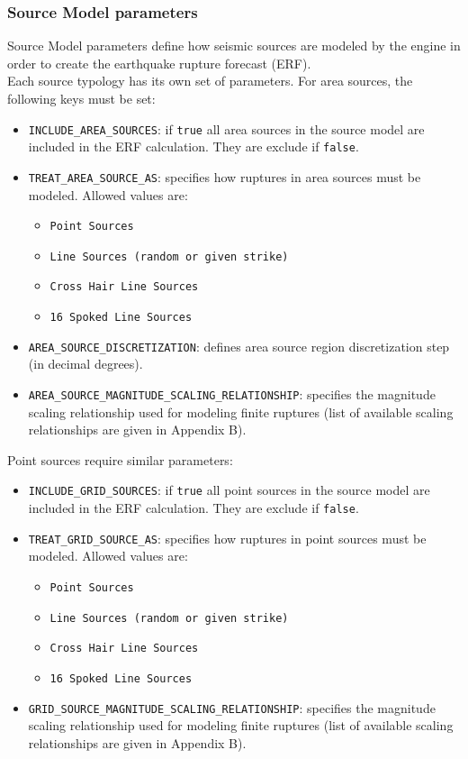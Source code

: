 \subsubsection{Source Model parameters}
Source Model parameters define how seismic sources are modeled by the engine in order to create the earthquake rupture forecast (ERF).\\
Each source typology has its own set of parameters. For area sources, the following keys must be set:
\begin{itemize}
\item \Verb+INCLUDE_AREA_SOURCES+: if \Verb+true+ all area sources in the source model are included in the ERF calculation. They are exclude if \Verb+false+.
\item \Verb+TREAT_AREA_SOURCE_AS+: specifies how ruptures in area sources must be modeled. Allowed values are:
\begin{itemize}
\item \Verb+Point Sources+
\item \Verb+Line Sources (random or given strike)+
\item \Verb+Cross Hair Line Sources+
\item \Verb+16 Spoked Line Sources+
\end{itemize}
\item \Verb+AREA_SOURCE_DISCRETIZATION+: defines area source region discretization step (in decimal degrees).
\item \Verb+AREA_SOURCE_MAGNITUDE_SCALING_RELATIONSHIP+: specifies the magnitude scaling relationship used for modeling finite ruptures (list of available scaling relationships are given in Appendix B).
\end{itemize}

Point sources require similar parameters:
\begin{itemize}
\item \Verb+INCLUDE_GRID_SOURCES+: if \Verb+true+ all point sources in the source model are included in the ERF calculation. They are exclude if \Verb+false+.
\item \Verb+TREAT_GRID_SOURCE_AS+: specifies how ruptures in point sources must be modeled. Allowed values are:
\begin{itemize}
\item \Verb+Point Sources+
\item \Verb+Line Sources (random or given strike)+
\item \Verb+Cross Hair Line Sources+
\item \Verb+16 Spoked Line Sources+
\end{itemize}
\item \Verb+GRID_SOURCE_MAGNITUDE_SCALING_RELATIONSHIP+: specifies the magnitude scaling relationship used for modeling finite ruptures (list of available scaling relationships are given in Appendix B).
\end{itemize}

